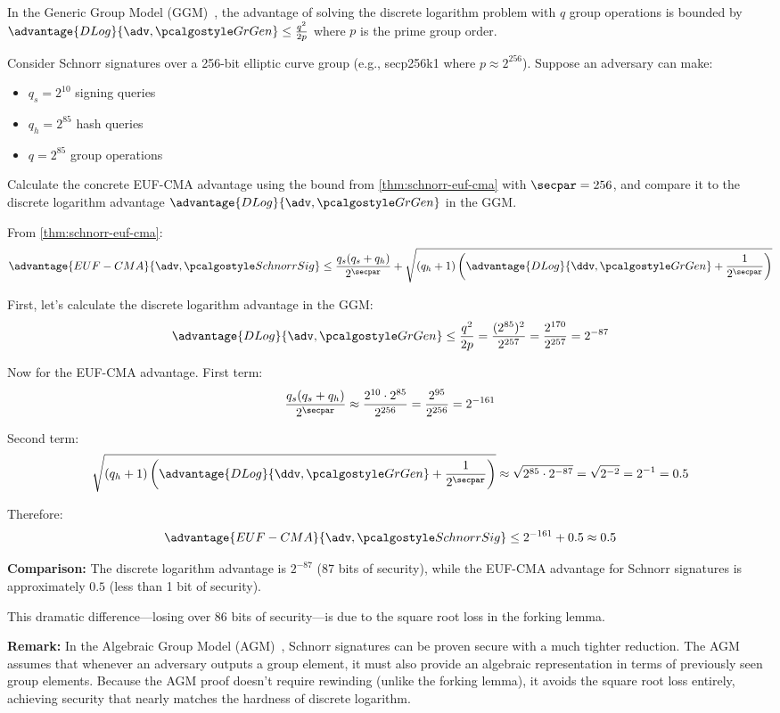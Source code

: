 \begin{exercise}
  In the Generic Group Model (GGM)~\cite{EC:Shoup97}, the advantage of solving the discrete logarithm problem with $q$ group operations is bounded by $\advantage{DLog}{\adv, \grgen} \leq \frac{q^2}{2p}$ where $p$ is the prime group order.
  
  Consider Schnorr signatures over a 256-bit elliptic curve group (e.g., secp256k1 where $p \approx 2^{256}$). Suppose an adversary can make:
  \begin{itemize}
    \item $q_s = 2^{10}$ signing queries
    \item $q_h = 2^{85}$ hash queries
    \item $q = 2^{85}$ group operations
  \end{itemize}
  
  Calculate the concrete EUF-CMA advantage using the bound from \autoref{thm:schnorr-euf-cma} with $\secpar = 256$, and compare it to the discrete logarithm advantage $\advantage{DLog}{\adv, \grgen}$ in the GGM.
\end{exercise}

\ifsolutions
\begin{mysolution}
  From \autoref{thm:schnorr-euf-cma}:
  \[
    \advantage{EUF-CMA}{\adv, \algo{SchnorrSig}} \leq \frac{q_s(q_s + q_h)}{2^\secpar} + \sqrt{(q_h + 1) \left(\advantage{DLog}{\ddv, \grgen} + \frac{1}{2^\secpar}\right)}
  \]
  
  First, let's calculate the discrete logarithm advantage in the GGM:
  \[
    \advantage{DLog}{\adv, \grgen} \leq \frac{q^2}{2p} = \frac{(2^{85})^2}{2^{257}} = \frac{2^{170}}{2^{257}} = 2^{-87}
  \]
  
  Now for the EUF-CMA advantage. First term:
  \[
    \frac{q_s(q_s + q_h)}{2^\secpar} \approx \frac{2^{10} \cdot 2^{85}}{2^{256}} = \frac{2^{95}}{2^{256}} = 2^{-161}
  \]
  
  Second term:
  \[
    \sqrt{(q_h + 1) \left(\advantage{DLog}{\ddv, \grgen} + \frac{1}{2^\secpar}\right)} \approx \sqrt{2^{85} \cdot 2^{-87}} = \sqrt{2^{-2}} = 2^{-1} = 0.5
  \]
  
  Therefore:
  \[
    \advantage{EUF-CMA}{\adv, \algo{SchnorrSig}} \leq 2^{-161} + 0.5 \approx 0.5
  \]
  
  \textbf{Comparison:} The discrete logarithm advantage is $2^{-87}$ (87 bits of security), while the EUF-CMA advantage for Schnorr signatures is approximately $0.5$ (less than 1 bit of security). 
  
  This dramatic difference—losing over 86 bits of security—is due to the square root loss in the forking lemma. 
  
  \textbf{Remark:} In the Algebraic Group Model (AGM)~\cite{C:FucKilLos18}, Schnorr signatures can be proven secure with a much tighter reduction. The AGM assumes that whenever an adversary outputs a group element, it must also provide an algebraic representation in terms of previously seen group elements. Because the AGM proof doesn't require rewinding (unlike the forking lemma), it avoids the square root loss entirely, achieving security that nearly matches the hardness of discrete logarithm.
\end{mysolution}
\fi


